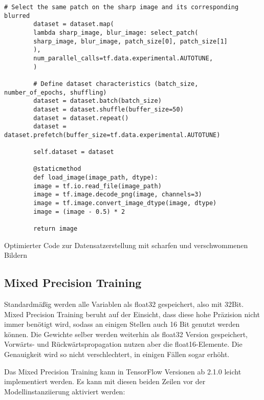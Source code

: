 \begin{code}
\begin{lstlisting}[numbers=none]
        # Select the same patch on the sharp image and its corresponding blurred
        dataset = dataset.map(
        lambda sharp_image, blur_image: select_patch(
        sharp_image, blur_image, patch_size[0], patch_size[1]
        ),
        num_parallel_calls=tf.data.experimental.AUTOTUNE,
        )
        
        # Define dataset characteristics (batch_size, number_of_epochs, shuffling)
        dataset = dataset.batch(batch_size)
        dataset = dataset.shuffle(buffer_size=50)
        dataset = dataset.repeat()
        dataset = dataset.prefetch(buffer_size=tf.data.experimental.AUTOTUNE)
        
        self.dataset = dataset
        
        @staticmethod
        def load_image(image_path, dtype):
        image = tf.io.read_file(image_path)
        image = tf.image.decode_png(image, channels=3)
        image = tf.image.convert_image_dtype(image, dtype)
        image = (image - 0.5) * 2
        
        return image
    \end{lstlisting}
    
    \caption{Optimierter Code zur Datensatzerstellung mit scharfen und verschwommenen Bildern}
\end{code}


\subsection{Mixed Precision Training}

Standardmäßig werden alle Variablen als float32 gespeichert, also mit 32Bit. Mixed Precision Training beruht auf der Einsicht, dass diese hohe Präzision nicht immer benötigt wird, sodass an einigen Stellen auch 16 Bit genutzt werden können. Die Gewichte selber werden weiterhin als float32 Version gespeichert, Vorwärts- und Rückwärtspropagation nutzen aber die float16-Elemente. Die Genauigkeit wird so nicht verschlechtert, in einigen Fällen sogar erhöht.

Das Mixed Precision Training kann in TensorFlow Versionen ab 2.1.0 leicht implementiert werden. Es kann mit diesen beiden Zeilen vor der Modellinstanziierung aktiviert werden:

\medskip




